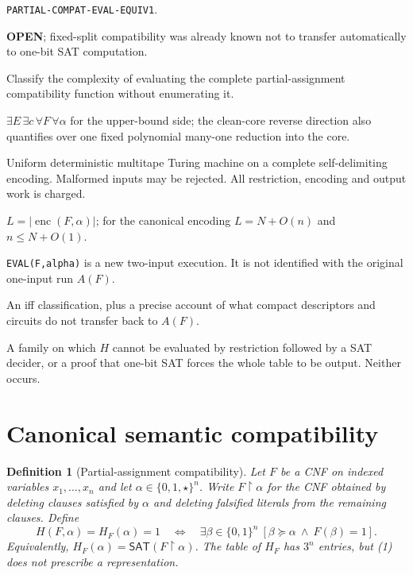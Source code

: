 \documentclass[11pt]{article}
\newtheorem{definition}{Definition}
\newcommand{\SAT}{\mathsf{SAT}}
\newcommand{\OPEN}{\textbf{OPEN}}
\begin{document}
\begin{description}[leftmargin=3.0cm,style=nextline]
\item[Claim ID.] \texttt{PARTIAL-COMPAT-EVAL-EQUIV1}.
\item[Status before run.] \OPEN; fixed-split compatibility was already known
not to transfer automatically to one-bit SAT computation.
\item[Desired conclusion.] Classify the complexity of evaluating the complete
partial-assignment compatibility function without enumerating it.
\item[Exact prefix.] $\exists E\,\exists c\,\forall F\,\forall\alpha$ for the
upper-bound side; the clean-core reverse direction also quantifies over one
fixed polynomial many-one reduction into the core.
\item[Model.] Uniform deterministic multitape Turing machine on a complete
self-delimiting encoding.  Malformed inputs may be rejected.  All restriction,
encoding and output work is charged.
\item[Input measure.] $L=|\operatorname{enc}(F,\alpha)|$; for the canonical
encoding $L=N+O(n)$ and $n\le N+O(1)$.
\item[SAME\_REALIZATION.] \texttt{EVAL(F,alpha)} is a new two-input execution.
It is not identified with the original one-input run $A(F)$.
\item[Weakest useful theorem.] An iff classification, plus a precise account
of what compact descriptors and circuits do not transfer back to $A(F)$.
\item[Falsifier.] A family on which $H$ cannot be evaluated by restriction
followed by a SAT decider, or a proof that one-bit SAT forces the whole table
to be output.  Neither occurs.
\end{description}

\section{Canonical semantic compatibility}

\begin{definition}[Partial-assignment compatibility]
Let $F$ be a CNF on indexed variables $x_1,\ldots,x_n$ and let
$\alpha\in\{0,1,\star\}^n$.  Write $F\upharpoonright\alpha$ for the CNF
obtained by deleting clauses satisfied by $\alpha$ and deleting falsified
literals from the remaining clauses.  Define
\[
 H(F,\alpha)=H_F(\alpha)=1
 \quad\Longleftrightarrow\quad
 \exists\beta\in\{0,1\}^n\ [\beta\succeq\alpha\ \wedge\ F(\beta)=1].
 \tag{1}
\]
Equivalently, $H_F(\alpha)=\SAT(F\upharpoonright\alpha)$.  The table of
$H_F$ has $3^n$ entries, but (1) does not prescribe a representation.
\end{definition}
\end{document}

